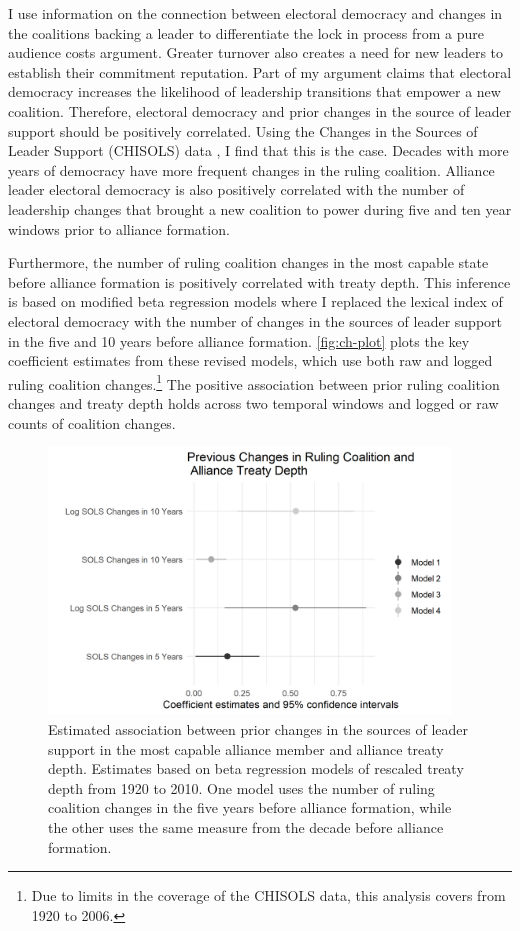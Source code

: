 \documentclass[12pt]{article}
\begin{document}
I use information on the connection between electoral democracy and changes in the coalitions backing a leader to differentiate the lock in process from a pure audience costs argument.
Greater turnover also creates a need for new leaders to establish their commitment reputation. 
Part of my argument claims that electoral democracy increases the likelihood of leadership transitions that empower a new coalition. 
Therefore, electoral democracy and prior changes in the source of leader support should be positively correlated.
Using the Changes in the Sources of Leader Support (CHISOLS) data \citep{Mattesetal2016}, I find that this is the case. 
Decades with more years of democracy have more frequent changes in the ruling coalition. 
Alliance leader electoral democracy is also positively correlated with the number of leadership changes that brought a new coalition to power during five and ten year windows prior to alliance formation. 


Furthermore, the number of ruling coalition changes in the most capable state before alliance formation is positively correlated with treaty depth. 
This inference is based on modified beta regression models where I replaced the lexical index of electoral democracy with the number of changes in the sources of leader support in the five and 10 years before alliance formation. 
\autoref{fig:ch-plot} plots the key coefficient estimates from these revised models, which use both raw and logged ruling coalition changes.\footnote{Due to limits in the coverage of the CHISOLS data, this analysis covers from 1920 to 2006.}
The positive association between prior ruling coalition changes and treaty depth holds across two temporal windows and logged or raw counts of coalition changes.


\begin{figure}[hbtp]
\centering
\includegraphics[width=0.95\textwidth]{../figures/ch-plot.png}
\caption{Estimated association between prior changes in the sources of leader support in the most capable alliance member and alliance treaty depth. Estimates based on beta regression models of rescaled treaty depth from 1920 to 2010. One model uses the number of ruling coalition changes in the five years before alliance formation, while the other uses the same measure from the decade before alliance formation.}
\label{fig:ch-plot}
\end{figure}
\end{document}
